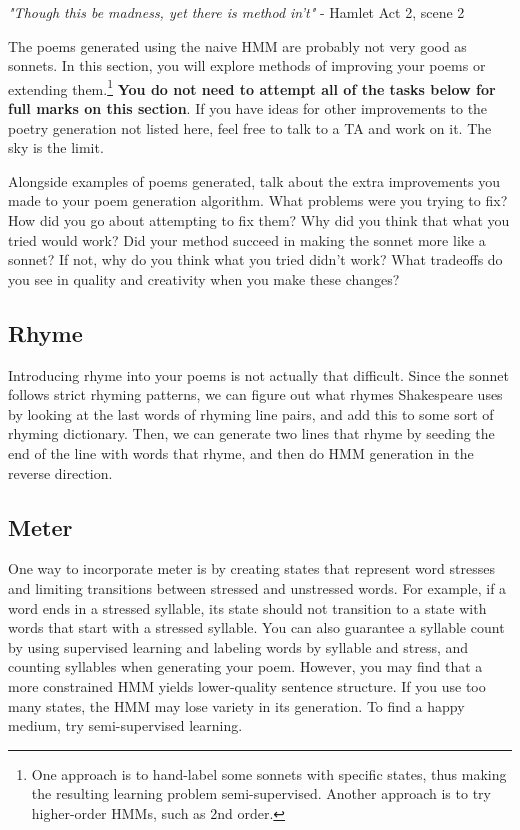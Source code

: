 \begin{center}
\emph{"Though this be madness, yet there is method in't"} - Hamlet Act 2, scene 2
\end{center}
\par
The poems generated using the naive HMM are probably not very good as sonnets. In this section, you will explore methods of improving your poems or extending them.\footnote{One approach is to hand-label some sonnets with specific states, thus making the resulting learning problem semi-supervised. Another approach is to try higher-order HMMs, such as 2nd order.} \textbf{You do not need to attempt all of the tasks below for full marks on this section}. If you have ideas for other improvements to the poetry generation not listed here, feel free to talk to a TA and work on it. The sky is the limit.
\begin{report}
    Alongside examples of poems generated, talk about the extra improvements you made to your poem generation algorithm. What problems were you trying to fix? How did you go about attempting to fix them? Why did you think that what you tried would work? Did your method succeed in making the sonnet more like a sonnet? If not, why do you think what you tried didn't work? What tradeoffs do you see in quality and creativity when you make these changes? \newline
\end{report}

\subsection{Rhyme}
Introducing rhyme into your poems is not actually that difficult. Since the sonnet follows strict rhyming patterns, we can figure out what rhymes Shakespeare uses by looking at the last words of rhyming line pairs,  and add this to some sort of rhyming dictionary. Then, we can generate two lines that rhyme by seeding the end of the line with words that rhyme, and then do HMM generation in the reverse direction.

\subsection{Meter}
One way to incorporate meter is by creating states that represent word stresses and limiting transitions between stressed and unstressed words. For example, if a word ends in a stressed syllable, its state should not transition to a state with words that start with a stressed syllable. You can also guarantee a syllable count by using supervised learning and labeling words by syllable and stress, and counting syllables when generating your poem. However, you may find that a more constrained HMM yields lower-quality sentence structure. If you use too many states, the HMM may lose variety in its generation. To find a happy medium, try semi-supervised learning.

